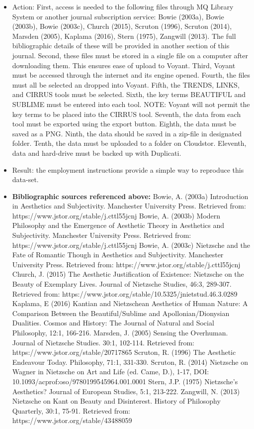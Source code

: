 \documentclass[a4paper,12pt]{article}
\begin{document}
\begin{itemize}
\item Action: First, access is needed to the following files through MQ Library System or another journal subscription service: Bowie (2003a), Bowie (2003b), Bowie (2003c), Church (2015), Scruton (1996), Scruton (2014), Marsden (2005), Kaplama (2016), Stern (1975), Zangwill (2013). The full bibliographic details of these will be provided in another section of this journal. Second, these files must be stored in a single file on a computer after downloading them. This ensures ease of upload to Voyant. Third, Voyant must be accessed through the internet and its engine opened. Fourth, the files must all be selected an dropped into Voyant. Fifth, the TRENDS, LINKS, and CIRRUS tools must be selected. Sixth, the key terms BEAUTIFUL and SUBLIME must be entered into each tool. NOTE: Voyant will not permit the key terms to be placed into the CIRRUS tool. Seventh, the data from each tool must be exported using the export button. Eighth, the data must be saved as a PNG. Ninth, the data should be saved in a zip-file in designated folder. Tenth, the data must be uploaded to a folder on Cloudstor. Eleventh, data and hard-drive must be backed up with Duplicati.


\item Result: the employment instructions provide a simple way to reproduce this data-set. 


\item \textbf{Bibliographic sources referenced above:} Bowie, A. (2003a) Introduction in Aesthetics and Subjectivity. Manchester University Press. Retrieved from: https://www.jstor.org/stable/j.cttl55jcnj
Bowie, A. (2003b) Modern Philosophy and the Emergence of Aesthetic Theory in Aesthetics and Subjectivity. Manchester University Press. Retrieved from: https://www.jstor.org/stable/j.cttl55jcnj
Bowie, A. (2003c) Nietzsche and the Fate of Romantic Though in Aesthetics and Subjectivity. Manchester University Press. Retrieved from: https://www.jstor.org/stable/j.cttl55jcnj
Church, J. (2015) The Aesthetic Justification of Existence: Nietzsche on the Beauty of Exemplary Lives. Journal of Nietzsche Studies, 46:3, 289-307. Retrieved from: https://www.jstor.org/stable/10.5325/jnietstud.46.3.0289
Kaplama, E (2016) Kantian and Nietzschean Aesthetics of Human Nature: A Comparison Between the Beautiful/Sublime and Apollonian/Dionysian Dualities. Cosmos and History: The Journal of Natural and Social Philosophy, 12:1, 166-216.
Marsden, J. (2005) Sensing the Overhuman. Journal of Nietzsche Studies. 30:1, 102-114. Retrieved from: https://www.jstor.org/stable/20717865
Scruton, R. (1996) The Aesthetic Endeavour Today. Philosophy, 71:1, 331-330. 
Scruton, R. (2014) Nietzsche on Wagner in Nietzsche on Art and Life (ed. Came, D.), 1-17, DOI: 10.1093/acprof:oso/9780199545964.001.0001
Stern, J.P. (1975) Nietzsche’s Aesthetics? Journal of European Studies, 5:1, 213-222. 
Zangwill, N. (2013) Nietzsche on Kant on Beauty and Disinterest. History of Philosophy Quarterly, 30:1, 75-91. Retrieved from: https://www.jstor.org/stable/43488059


\end {itemize}
\end{document}
